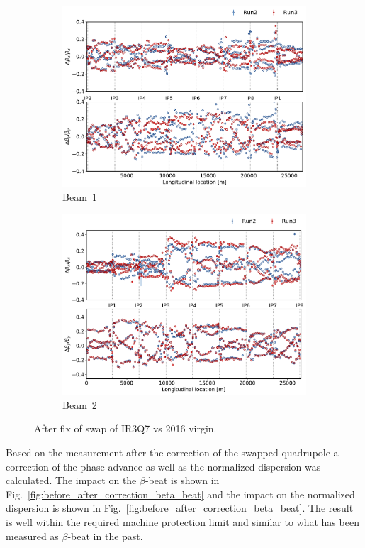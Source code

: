 \documentclass[a4paper]{cernatsnote}
\begin{document}
\begin{figure}[ht]
\begin{subfigure}{.5\textwidth}
  \centering
  \includegraphics[width=.8\linewidth]{plots/beam1/beta_beat_2016_2021_swap_fixed.pdf}  
  \caption{Beam~1}
\end{subfigure}
\begin{subfigure}{.5\textwidth}
  \centering
  \includegraphics[width=.8\linewidth]{plots/beam2/B2_BetaBeat_afterIR3Q7fix_vs_virgin2016.pdf}  
  \caption{Beam~2}
\end{subfigure}
\caption{After fix of swap of IR3Q7 vs 2016 virgin.}
\label{fig:after_swap_vs_2016}
\end{figure}

Based on the measurement after the correction of the swapped quadrupole a correction of the phase advance as well as the normalized dispersion was calculated. The impact on the $\beta$-beat is shown in Fig.~\ref{fig:before_after_correction_beta_beat} and the impact on the normalized dispersion is shown in Fig.~\ref{fig:before_after_correction_beta_beat}. The result is well within the required machine protection limit and similar to what has been measured as $\beta$-beat in the past. 
\end{document}
